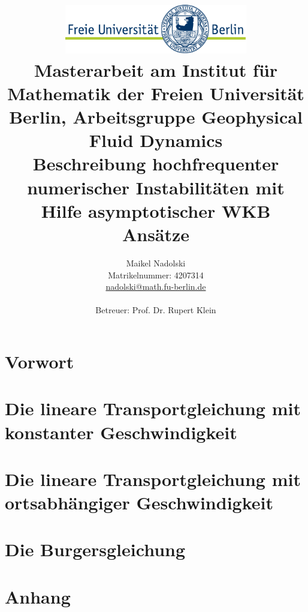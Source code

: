 \documentclass[a4paper
               ,11pt%
               ,5BCOM%
               ,openright%
               ,titlepage%
               ,twoside%
               ]{scrreprt}
\title{\includegraphics[width=0.6\textwidth]{pictures/logo}\\
{\normalsize Masterarbeit am Institut für Mathematik der Freien Universität Berlin, Arbeitsgruppe Geophysical Fluid Dynamics}\\[6ex]
Beschreibung hochfrequenter numerischer Instabilitäten mit Hilfe asymptotischer WKB Ansätze}
\author{Maikel Nadolski\\
{\normalsize Matrikelnummer: 4207314}\\
{\normalsize \href{mailto:nadolski@math.fu-berlin.de}{nadolski@math.fu-berlin.de}}
\vspace{3cm}\\\\
{\normalsize Betreuer: Prof. Dr. Rupert Klein}}
\numberwithin{equation}{section}
\begin{document}
\maketitle
\restoregeometry

\tableofcontents

\chapter{Vorwort}

% 
\chapter{Die lineare Transportgleichung mit konstanter Geschwindigkeit}

\chapter{Die lineare Transportgleichung mit ortsabhängiger Geschwindigkeit}

\chapter{Die Burgersgleichung}




\appendix

\chapter{Anhang}


\end{document}

